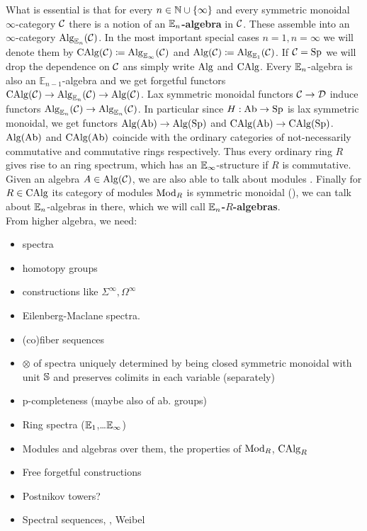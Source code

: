 What is essential is that for every $n\in\N\cup\{\infty\}$ and every symmetric monoidal $\infty$-category $\cC$ there is a notion of an \textbf{$\En$-algebra} in $\cC$. 
These assemble into an $\infty$-category $\Alg_{\En}(\cC)$. 
In the most important special cases $n=1,n=\infty$ we will denote them by $\CAlg(\cC)\coloneqq \Alg_{\Einf}(\cC)$ and $\Alg(\cC)\coloneqq \Alg_{\Eone}(\cC)$. If $\cC=\Sp$ we will drop the dependence on $\cC$ ans simply write $\Alg$ and $\CAlg$.
Every $\En$-algebra is also an $\mathbb{E}_{n-1}$-algebra and we get forgetful functors $\CAlg(\cC)\ra \Alg_{\En}(\cC)\ra \Alg(\cC)$. 
Lax symmetric monoidal functors $\cC\ra\cD$ induce functors $\Alg_{\En}(\cC)\ra \Alg_{\En}(\cC)$. In particular since $H:\Ab\ra\Sp$ is lax symmetric monoidal, we get functors $\Alg(\Ab)\ra \Alg(\Sp)$ and  $\CAlg(\Ab)\ra \CAlg(\Sp)$. $\Alg(\Ab)$ and $\CAlg(\Ab)$ coincide with the ordinary categories of not-necessarily commutative and commutative rings respectively. Thus every ordinary ring $R$ gives rise to an ring spectrum, which has an $\Einf$-structure if $R$ is commutative.
\\
Given an algebra $A\in \Alg(\cC)$, we are also able to talk about modules \cite[Definition~4.2.1.13]{lurie2017higher}.
Finally for $R\in \CAlg$ its category of modules $\Mod_R$ is symmetric monoidal (\cite[Theorem~4.5.2.1]{lurie2017higher}), we can talk about $\En$-algebras in there, which we will call \textbf{$\En$-$R$-algebras}.  
\\
From higher algebra, we need:
\begin{itemize}
    \item spectra
    \item homotopy groups
    \item constructions like $\Sigma^\infty,\Omega^\infty$ 
    \item Eilenberg-Maclane spectra.
    \item (co)fiber sequences
    \item $\otimes$ of spectra uniquely determined by being closed symmetric monoidal with unit $\S$ and preserves colimits in each variable (separately)
    \item p-completeness (maybe also of ab. groups)
    \item Ring spectra ($\Eone$,\dots $\Einf$)
    \item Modules and algebras over them, the properties of $\Mod_R$, $\CAlg_R$
    \item Free forgetful constructions
    \item Postnikov towers?
    \item Spectral sequences, \cite[Section~1.2.2]{lurie2017higher}, Weibel \cite[Chapter~5]{weibel1994introduction}
\end{itemize}
